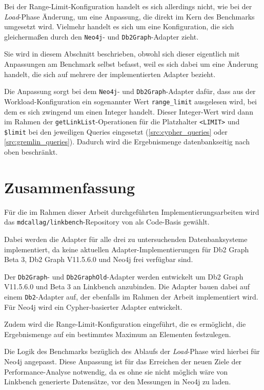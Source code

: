 Bei der Range-Limit-Konfiguration handelt es sich allerdings nicht, wie bei der \textit{Load}-Phase Änderung, um eine Anpassung, die direkt im Kern des Benchmarks umgesetzt wird. Vielmehr handelt es sich um eine Konfiguration, die sich gleichermaßen durch den \texttt{Neo4j}- und \texttt{Db2Graph}-Adapter zieht. 

Sie wird in diesem Abschnitt beschrieben, obwohl sich dieser eigentlich mit Anpassungen am Benchmark selbst befasst, weil es sich dabei um eine Änderung handelt, die sich auf mehrere der implementierten Adapter bezieht.

Die Anpassung sorgt bei dem \texttt{Neo4j}- und \texttt{Db2Graph}-Adapter dafür, dass aus der Workload-Konfiguration ein sogenannter Wert \texttt{range\_limit} ausgelesen wird, bei dem es sich zwingend um einen Integer handelt. Dieser Integer-Wert wird dann im Rahmen der \texttt{getLinkList}-Ope\-ra\-ti\-on\-en für die Platzhalter \texttt{<LIMIT>} und \texttt{\$limit} bei den jeweiligen Queries eingesetzt (\autoref{src:cypher_queries} oder \ref{src:gremlin_queries}). Dadurch wird die Ergebnismenge datenbankseitig nach oben beschränkt. 

\section{Zusammenfassung}
\label{implementierung:zusammenfassung}
Für die im Rahmen dieser Arbeit durchgeführten Implementierungsarbeiten wird das \texttt{mdcallag/linkbench}-Repository von  als Code-Basis gewählt.

Dabei werden die Adapter für alle drei zu untersuchenden Datenbanksysteme implementiert, da keine aktuellen Adapter-Implementierungen für Db2 Graph Beta 3, Db2 Graph V11.5.6.0 und Neo4j frei verfügbar sind.

Der \texttt{Db2Graph}- und \texttt{Db2GraphOld}-Adapter werden entwickelt um Db2 Graph V11.5.6.0 und Beta 3 an Linkbench anzubinden. Die Adapter bauen dabei auf einem \texttt{Db2}-Adapter auf, der ebenfalls im Rahmen der Arbeit implementiert wird. Für Neo4j wird ein Cypher-basierter Adapter entwickelt. 

Zudem wird die Range-Limit-Konfiguration eingeführt, die es ermöglicht, die Ergebnismenge auf ein bestimmtes Maximum an Elementen festzulegen. 

Die Logik des Benchmarks bezüglich des Ablaufs der \textit{Load}-Phase wird hierbei für Neo4j angepasst. Diese Anpassung ist für das Erreichen der neuen Ziele der Performance-Analyse notwendig, da es ohne sie nicht möglich wäre von Linkbench generierte Datensätze, vor den Messungen in Neo4j zu laden. 
